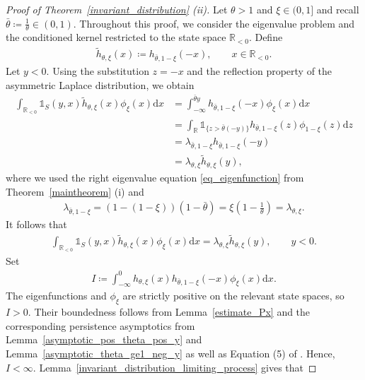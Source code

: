 \documentclass[12pt]{article}
\newcommand{\R}{\mathbb{R}} %
\newcommand{\1}{\mathds{1}}
\renewcommand{\d}{\mathrm{d}}
\theoremstyle{definition}
\theoremstyle{plain}
\theoremstyle{remark}
\begin{document}
\begin{proof}[Proof of Theorem~\ref{invariant_distribution} (ii)]
Let $\theta>1$ and $\xi\in(0,1]$ and recall $
\bar\theta \coloneqq \frac{1}{\theta}\in(0,1)$.
Throughout this proof, we consider the eigenvalue problem and the
conditioned kernel restricted to the state space $\R_{<0}$. Define 
\begin{align*} 
    \tilde h_{\theta,\xi}(x) \coloneqq h_{\bar\theta,1-\xi}(-x), \qquad x\in\R_{<0}. 
\end{align*} 
Let $y<0$. Using the substitution $z=-x$ and the reflection property of the asymmetric Laplace distribution, we obtain
\begin{align*} 
    \int_{\R_{<0}} \mathds{1}_S(y,x) \tilde h_{\theta,\xi}(x) \phi_\xi( x)\d x 
     &= \int_{-\infty}^{\bar\theta y} h_{\bar\theta,1-\xi}(-x) \phi_\xi( x)\d x 
    \\ &= \int_\R \mathds{1}_{\{z>\bar\theta(-y)\}} h_{\bar\theta,1-\xi}(z) \phi_{1-\xi}( z)\d z 
    \\ &= \lambda_{\bar\theta,1-\xi} h_{\bar\theta,1-\xi}(-y)
        \\ &= \lambda_{\theta,\xi} \tilde h_{\theta,\xi}(y),
\end{align*} 
where we used the right eigenvalue equation \eqref{eq_eigenfunction} from Theorem~\ref{maintheorem} (i) and
\begin{align*} 
    \lambda_{\bar\theta,1-\xi}
    = (1-(1-\xi))(1-\bar\theta) 
    = \xi\left(1-\frac{1}{\theta}\right) 
    = \lambda_{\theta,\xi}. 
\end{align*} 
It follows that 
\begin{align*} 
    \int_{\R_{<0}} \mathds{1}_S(y,x) \tilde h_{\theta,\xi}(x) \phi_\xi( x)\d x = \lambda_{\theta,\xi} \tilde h_{\theta,\xi}(y), \qquad y<0. 
\end{align*}
Set 
\begin{align*} 
    I\coloneqq \int_{-\infty}^0 h_{\theta,\xi}(x) h_{\bar\theta,1-\xi}(-x) \phi_\xi( x)\d x.
\end{align*} 
The eigenfunctions and $\phi_\xi$ are strictly positive on the relevant state spaces, so $I >0$. Their boundedness follows from Lemma~\ref{estimate_Px} and the corresponding persistence asymptotics from Lemma~\ref{asymptotic_pos_theta_pos_y} and Lemma~\ref{asymptotic_theta_ge1_neg_y} as well as Equation (5) of \cite{AR}. Hence, $I <\infty$.
Lemma~\ref{invariant_distribution_limiting_process} gives that

\end{proof}
\end{document}
